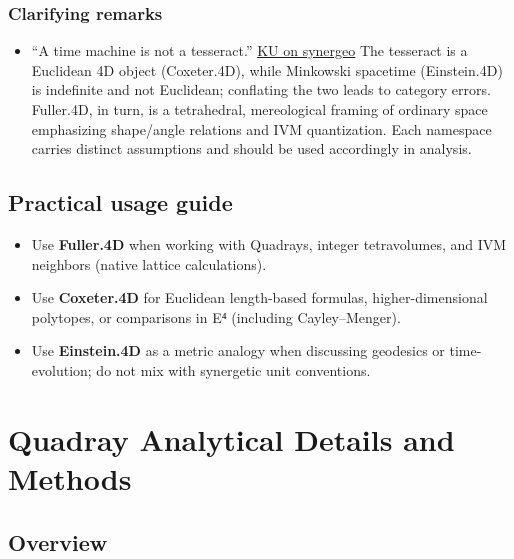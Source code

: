 \documentclass[
  10pt,
]{article}
\providecommand{\tightlist}{%
  \setlength{\itemsep}{0pt}\setlength{\parskip}{0pt}}
\begin{document}
\hypertarget{clarifying-remarks}{%
\subsubsection{Clarifying remarks}\label{clarifying-remarks}}

\begin{itemize}
\tightlist
\item
  ``A time machine is not a tesseract.''
  \href{https://groups.io/g/synergeo/topic/my_take_on_close_pack/114531919}{KU
  on synergeo} The tesseract is a Euclidean 4D object (Coxeter.4D),
  while Minkowski spacetime (Einstein.4D) is indefinite and not
  Euclidean; conflating the two leads to category errors. Fuller.4D, in
  turn, is a tetrahedral, mereological framing of ordinary space
  emphasizing shape/angle relations and IVM quantization. Each namespace
  carries distinct assumptions and should be used accordingly in
  analysis.
\end{itemize}

\hypertarget{practical-usage-guide}{%
\subsection{Practical usage guide}\label{practical-usage-guide}}

\begin{itemize}
\tightlist
\item
  Use \textbf{Fuller.4D} when working with Quadrays, integer
  tetravolumes, and IVM neighbors (native lattice calculations).
\item
  Use \textbf{Coxeter.4D} for Euclidean length-based formulas,
  higher-dimensional polytopes, or comparisons in E⁴ (including
  Cayley--Menger).
\item
  Use \textbf{Einstein.4D} as a metric analogy when discussing geodesics
  or time-evolution; do not mix with synergetic unit conventions. 
\end{itemize}

\hypertarget{quadray-analytical-details-and-methods}{%
\section{Quadray Analytical Details and
Methods}\label{quadray-analytical-details-and-methods}}

\hypertarget{overview}{%
\subsection{Overview}\label{overview}}
\end{document}
